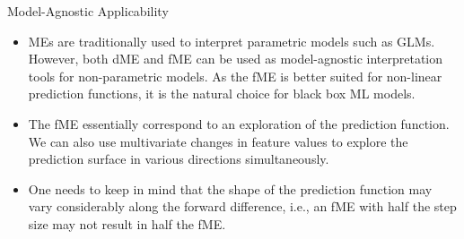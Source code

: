 \documentclass[11pt,compress,t,notes=noshow, aspectratio=169, xcolor=table]{beamer}
\begin{document}
\begin{frame}{Model-Agnostic Applicability}

\begin{itemize}
\itemsep2em
\item MEs are traditionally used to interpret parametric models such as GLMs. However, both dME and fME can be used as model-agnostic interpretation tools for non-parametric models. As the fME is better suited for non-linear prediction functions, it is the natural choice for black box ML models.
\item The fME essentially correspond to an exploration of the prediction function. We can also use multivariate changes in feature values to explore the prediction surface in various directions simultaneously.
\item One needs to keep in mind that the shape of the prediction function may vary considerably along the forward difference, i.e., an fME with half the step size may not result in half the fME.
\end{itemize}

\end{frame}





\endlecture
\end{document}
